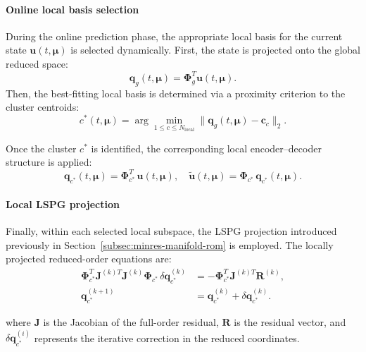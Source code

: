 \paragraph{Online local basis selection}
During the online prediction phase, the appropriate local basis for the current state \(\mathbf{u}(t,\boldsymbol{\mu})\) is selected dynamically. First, the state is projected onto the global reduced space:
\begin{equation}
\mathbf{q}_{g}(t,\boldsymbol{\mu}) = \boldsymbol{\Phi}_{g}^T \mathbf{u}(t,\boldsymbol{\mu}).
\end{equation}
Then, the best-fitting local basis is determined via a proximity criterion to the cluster centroids:
\begin{equation}
c^*(t,\boldsymbol{\mu}) = \arg\min_{1\leq c\leq N_{\text{local}}} 
\|\mathbf{q}_{g}(t,\boldsymbol{\mu}) - \mathbf{c}_c\|_2.
\label{eq:online_selection_rule}
\end{equation}

Once the cluster \(c^*\) is identified, the corresponding local encoder–decoder structure is applied:
\begin{equation}
\mathbf{q}_{c^*}(t,\boldsymbol{\mu}) = \boldsymbol{\Phi}_{c^*}^T\,\mathbf{u}(t,\boldsymbol{\mu}),\quad
\mathbf{\tilde{u}}(t,\boldsymbol{\mu}) = \boldsymbol{\Phi}_{c^*}\,\mathbf{q}_{c^*}(t,\boldsymbol{\mu}).
\end{equation}

\paragraph{Local LSPG projection}
Finally, within each selected local subspace, the LSPG projection introduced previously in Section~\ref{subsec:minres-manifold-rom} is employed. The locally projected reduced-order equations are:
\begin{subequations}
\begin{align}
\boldsymbol{\Phi}_{c^*}^T \mathbf{J}^{(k)T} \mathbf{J}^{(k)} \boldsymbol{\Phi}_{c^*} \, \delta \mathbf{q}_{c^*}^{(k)} 
&= - \boldsymbol{\Phi}_{c^*}^T \mathbf{J}^{(k)T} \mathbf{R}^{(k)},
\label{eq:local_lspg_linear}\\
\mathbf{q}_{c^*}^{(k+1)} &= \mathbf{q}_{c^*}^{(k)} + \delta \mathbf{q}_{c^*}^{(k)}.
\label{eq:local_lspg}
\end{align}
\end{subequations}

where \(\mathbf{J}\) is the Jacobian of the full-order residual, \(\mathbf{R}\) is the residual vector, and \(\delta \mathbf{q}_{c^*}^{(i)}\) represents the iterative correction in the reduced coordinates.

